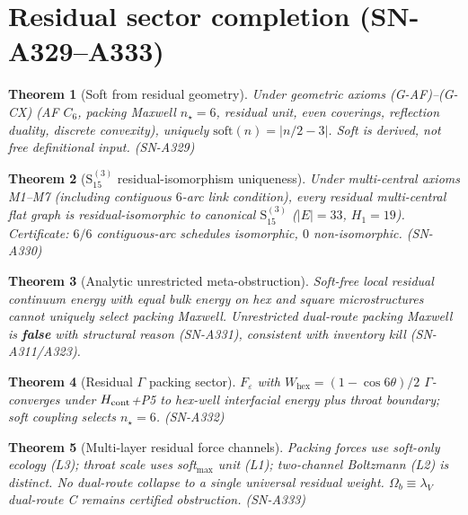 \documentclass[11pt,a4paper]{article}
\newtheorem{theorem}{Theorem}
\theoremstyle{remark}
\begin{document}
\section{Residual sector completion (SN-A329--A333)}
\label{sec:completion-A329}

\begin{theorem}[Soft from residual geometry]
Under geometric axioms (G-AF)--(G-CX) (AF $C_6$, packing Maxwell $n_\star=6$, residual unit, even coverings, reflection duality, discrete convexity), uniquely $\mathrm{soft}(n)=|n/2-3|$. Soft is derived, not free definitional input. (SN-A329)
\end{theorem}

\begin{theorem}[$\mathrm{S}_{15}^{(3)}$ residual-isomorphism uniqueness]
Under multi-central axioms M1--M7 (including contiguous $6$-arc link condition), every residual multi-central flat graph is residual-isomorphic to canonical $\mathrm{S}_{15}^{(3)}$ ($|E|=33$, $H_1=19$). Certificate: $6/6$ contiguous-arc schedules isomorphic, $0$ non-isomorphic. (SN-A330)
\end{theorem}

\begin{theorem}[Analytic unrestricted meta-obstruction]
Soft-free local residual continuum energy with equal bulk energy on hex and square microstructures cannot uniquely select packing Maxwell. Unrestricted dual-route packing Maxwell is \textbf{false} with structural reason (SN-A331), consistent with inventory kill (SN-A311/A323).
\end{theorem}

\begin{theorem}[Residual $\Gamma$ packing sector]
$F_\varepsilon$ with $W_{\mathrm{hex}}=(1-\cos 6\theta)/2$ $\Gamma$-converges under $H_{\rm cont}$+P5 to hex-well interfacial energy plus throat boundary; soft coupling selects $n_\star=6$. (SN-A332)
\end{theorem}

\begin{theorem}[Multi-layer residual force channels]
Packing forces use soft-only ecology (L3); throat scale uses soft$_{\max}$ unit (L1); two-channel Boltzmann (L2) is distinct. No dual-route collapse to a single universal residual weight. $\Omega_b\equiv\lambda_V$ dual-route C remains certified obstruction. (SN-A333)
\end{theorem}
\end{document}
